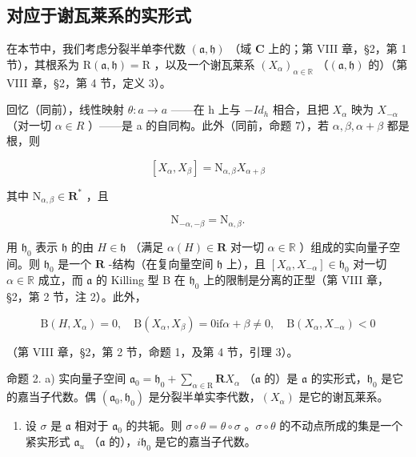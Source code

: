 \subsection{对应于谢瓦莱系的实形式}

在本节中，我们考虑分裂半单李代数 \((\mathfrak{a},\mathfrak{h})\) （域 \(\mathbf{C}\) 上的；第 VIII 章，§2，第 1 节），其根系为 \(\mathrm{R}(\mathfrak{a},\mathfrak{h}) = \mathrm{R}\) ，以及一个谢瓦莱系 \((X_{\alpha})_{\alpha \in \mathbb{R}}\) （\((\mathfrak{a},\mathfrak{h})\) 的）（第 VIII 章，§2，第 4 节，定义 3）。

回忆（同前），线性映射 \(\theta: a \to a\) ——在 h 上与 \(-Id_{h}\) 相合，且把 \(X_{\alpha}\) 映为 \(X_{-\alpha}\) （对一切 \(\alpha \in R\) ）——是 a 的自同构。此外（同前，命题 7），若 \(\alpha, \beta, \alpha + \beta\) 都是根，则

\[
[ X _ {\alpha}, X _ {\beta} ] = \mathrm{N} _ {\alpha , \beta} X _ {\alpha + \beta}\tag{3}
\]

其中 \(\mathrm{N}_{\alpha ,\beta}\in \mathbf{R}^*\) ，且

\[
\mathrm{N} _ {- \alpha , - \beta} = \mathrm{N} _ {\alpha , \beta}.\tag{4}
\]

用 \(\mathfrak{h}_0\) 表示 \(\mathfrak{h}\) 的由 \(H\in \mathfrak{h}\) （满足 \(\alpha (H)\in \mathbf{R}\) 对一切 \(\alpha \in \mathbb{R}\) ）组成的实向量子空间。则 \(\mathfrak{h}_0\) 是一个 \(\mathbf{R}\) -结构（在复向量空间 \(\mathfrak{h}\) 上），且 \([X_{\alpha},X_{-\alpha}]\in \mathfrak{h}_0\) 对一切 \(\alpha \in \mathbb{R}\) 成立，而 \(\mathfrak{a}\) 的 Killing 型 B 在 \(\mathfrak{h}_0\) 上的限制是分离的正型（第 VIII 章，§2，第 2 节，注 2）。此外，

\[
\mathrm{B} (H, X _ {\alpha}) = 0, \quad \mathrm{B} (X _ {\alpha}, X _ {\beta}) = 0 \text {if} \alpha + \beta \neq 0, \quad \mathrm{B} (X _ {\alpha}, X _ {- \alpha}) <   0\tag{5}
\]

（第 VIII 章，§2，第 2 节，命题 1，及第 4 节，引理 3）。

命题 2. a) 实向量子空间 \(\mathfrak{a}_0 = \mathfrak{h}_0 + \sum_{\alpha \in \mathrm{R}} \mathbf{R}X_\alpha\) （\(\mathfrak{a}\) 的）是 \(\mathfrak{a}\) 的实形式，\(\mathfrak{h}_0\) 是它的嘉当子代数。偶 \((\mathfrak{a}_0, \mathfrak{h}_0)\) 是分裂半单实李代数，\((X_\alpha)\) 是它的谢瓦莱系。

\begin{enumerate}
\def\labelenumi{\alph{enumi})}
\setcounter{enumi}{1}
\tightlist
\item
  设 \(\sigma\) 是 \(\mathfrak{a}\) 相对于 \(\mathfrak{a}_0\) 的共轭。则 \(\sigma \circ \theta = \theta \circ \sigma\) 。\(\sigma \circ \theta\) 的不动点所成的集是一个紧实形式 \(\mathfrak{a}_u\) （\(\mathfrak{a}\) 的），\(i\mathfrak{h}_0\) 是它的嘉当子代数。
\end{enumerate}

